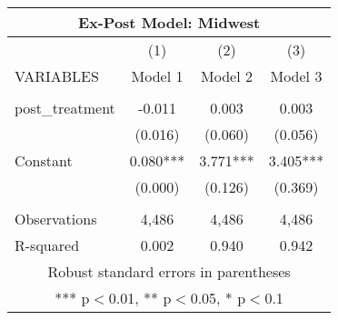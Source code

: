 \begin{tabular}{lccc}
\multicolumn{4}{c}{Ex-Post Model: Midwest} \\ \hline
 & (1) & (2) & (3) \\
VARIABLES & Model 1 & Model 2 & Model 3 \\ \hline
 &  &  &  \\
post\_treatment & -0.011 & 0.003 & 0.003 \\
 & (0.016) & (0.060) & (0.056) \\
Constant & 0.080*** & 3.771*** & 3.405*** \\
 & (0.000) & (0.126) & (0.369) \\
 &  &  &  \\
Observations & 4,486 & 4,486 & 4,486 \\
 R-squared & 0.002 & 0.940 & 0.942 \\ \hline
\multicolumn{4}{c}{ Robust standard errors in parentheses} \\
\multicolumn{4}{c}{ *** p$<$0.01, ** p$<$0.05, * p$<$0.1} \\
\end{tabular}
